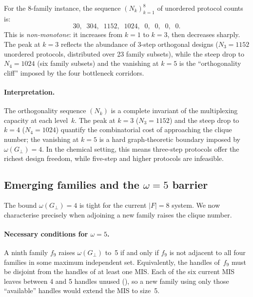 \documentclass[preprint,12pt]{elsarticle}
\theoremstyle{definition}
\theoremstyle{remark}
\begin{document}
For the 8-family instance,
the sequence $(N_k)_{k=1}^{8}$ of unordered protocol counts is:
\[
  30, \;\; 304, \;\; 1152, \;\; 1024, \;\; 0, \;\; 0, \;\; 0, \;\; 0.
\]
This is \emph{non-monotone}: it increases from $k = 1$
to $k = 3$, then decreases sharply.  The peak at $k = 3$
reflects the abundance of 3-step orthogonal designs
($N_3 = 1152$ unordered protocols, distributed over 23 family
subsets), while the steep drop to $N_4 = 1024$ (six family
subsets) and the vanishing at $k = 5$ is the ``orthogonality
cliff'' imposed by the four bottleneck corridors.

\paragraph{Interpretation.}
The orthogonality sequence $(N_k)$ is a complete invariant of the
multiplexing capacity at each level~$k$.  The peak at $k = 3$
($N_3 = 1152$) and the steep drop to $k = 4$ ($N_4 = 1024$)
quantify the combinatorial cost of approaching the clique number;
the vanishing at $k = 5$ is a hard graph-theoretic boundary
imposed by $\omega(G_\perp) = 4$.  In the chemical setting, this
means three-step protocols offer the richest design freedom,
while five-step and higher protocols are infeasible.


\subsection{Emerging families and the $\omega = 5$ barrier}\label{sec:omega5}

The bound $\omega(G_\perp) = 4$ is tight for the current
$|F| = 8$ system.  We now characterise precisely when adjoining
a new family raises the clique number.

\paragraph{Necessary conditions for $\omega = 5$.}
A ninth family $f_9$ raises $\omega(G_\perp)$ to~5 if and only
if $f_9$ is not adjacent to all four families in some maximum
independent set.  Equivalently, the handles of~$f_9$ must be
disjoint from the handles of at least one MIS.  Each of the
six current MIS leaves between 4 and 5 handles unused
(), so a new family using only
those ``available'' handles would extend the MIS to size~5.
\end{document}
